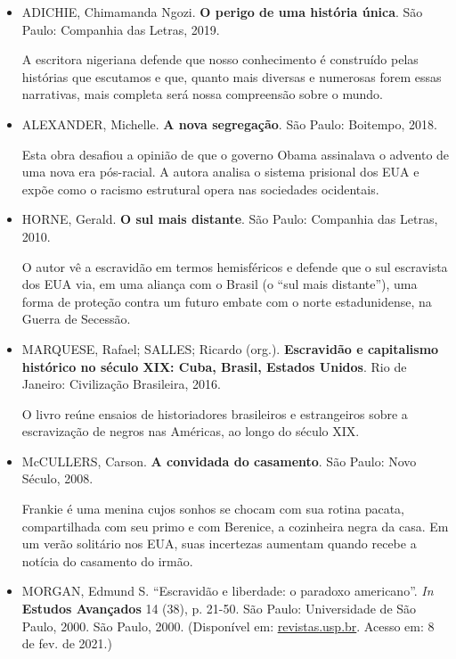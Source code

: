 \documentclass[11pt]{extarticle}
\begin{document}
\begin{itemize}
\item
ADICHIE, Chimamanda Ngozi. \textbf{O perigo de uma história única}.
São Paulo: Companhia das Letras, 2019.

A escritora nigeriana defende que nosso conhecimento é construído pelas
histórias que escutamos e que, quanto mais diversas e numerosas forem
essas narrativas, mais completa será nossa compreensão sobre o mundo.

\item
ALEXANDER, Michelle. \textbf{A nova segregação}. São Paulo: Boitempo,
2018.

Esta obra desafiou a opinião de que o governo Obama assinalava o advento
de uma nova era pós-racial. A autora analisa o sistema prisional dos EUA
e expõe como o racismo estrutural opera nas sociedades ocidentais.

\item
  HORNE, Gerald. \textbf{O sul mais distante}. São Paulo: Companhia das
  Letras, 2010.

O autor vê a escravidão em termos hemisféricos e defende que o sul
escravista dos EUA via, em uma aliança com o Brasil (o ``sul mais
distante''), uma forma de proteção contra um futuro embate com o norte
estadunidense, na Guerra de Secessão.

\item
  MARQUESE, Rafael; SALLES; Ricardo (org.). \textbf{Escravidão e
  capitalismo histórico no século XIX: Cuba, Brasil, Estados Unidos}.
  Rio de Janeiro: Civilização Brasileira, 2016.

O livro reúne ensaios de historiadores brasileiros e estrangeiros sobre
a escravização de negros nas Américas, ao longo do século XIX.

\item
  McCULLERS, Carson. \textbf{A convidada do casamento}. São Paulo: Novo
  Século, 2008.

Frankie é uma menina cujos sonhos se chocam com sua rotina pacata,
compartilhada com seu primo e com Berenice, a cozinheira negra da casa.
Em um verão solitário nos EUA, suas incertezas aumentam quando recebe a
notícia do casamento do irmão.

\item
  MORGAN, Edmund S. ``Escravidão e liberdade: o paradoxo americano''.
  \emph{In} \textbf{Estudos Avançados} 14 (38), p. 21-50. São Paulo:
  Universidade de São Paulo, 2000. São Paulo, 2000. (Disponível em:
  \href{http://www.revistas.usp.br/eav/article/view/9507}{revistas.usp.br}.
  Acesso em: 8 de fev. de 2021.)


\end{itemize}
\end{document}
